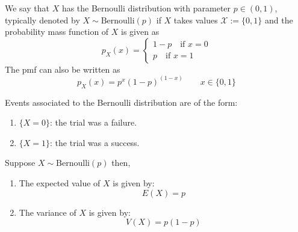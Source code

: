 \begin{defn}
    We say that $X$ has the Bernoulli distribution with parameter $p\in (0,1)$, typically denoted by $X \sim \text{Bernoulli}(p)$ if $X$ takes values $\mathcal{X}:= \{0,1\}$ and the probability mass function of $X$ is given as
    $$p_X(x) = \begin{cases}
        1-p \quad \text{if $x=0$}\\
        p \quad \text{if $x=1$}
    \end{cases}$$
    The pmf can also be written as
    $$p_X(x) = p^x(1-p)^{(1-x)}\quad \quad x\in \{0,1\}$$
\end{defn}

Events associated to the Bernoulli distribution are of the form:
\begin{enumerate}
    \item $\{X = 0\}$: the trial was a failure.
    \item $\{X =1\}$: the trial was a success. 
\end{enumerate}


\begin{thm}
    Suppose $X\sim \text{Bernoulli}(p)$ then,
    \begin{enumerate}
        \item The expected value of $X$ is given by:
        $$E(X) = p$$
        \item The variance of $X$ is given by:
        $$V(X) = p(1-p)$$
    \end{enumerate}
\end{thm}

